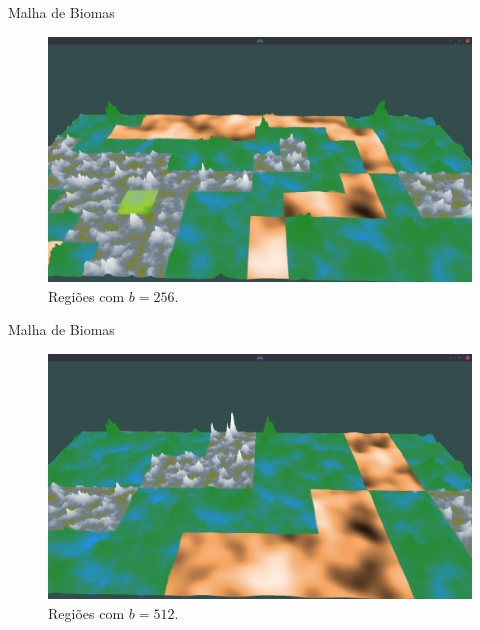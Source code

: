 \begin{frame}{Malha de Biomas}
    \begin{figure}[H]
        \centering
        \includegraphics[width=.9\textwidth]{img/re2bfb/b/256f4.png}
        \caption{Regiões com $b = 256$.}
        \label{fig:img_re2bfb_b_256f4}
    \end{figure}
    
    
\end{frame}

\begin{frame}{Malha de Biomas}
    \begin{figure}[H]
        \centering
        \includegraphics[width=.9\textwidth]{img/re2bfb/b/512f4.png}
        \caption{Regiões com $b = 512$.}
        \label{fig:img_re2bfb_b_512f4}
    \end{figure}
    
    
\end{frame}

